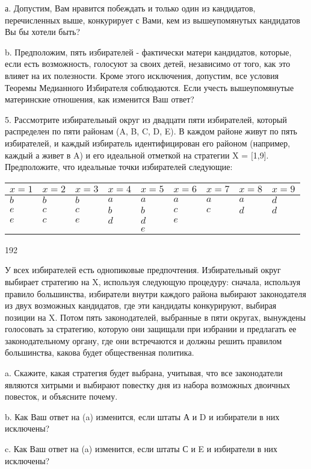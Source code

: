 \documentclass[a4paper,12pt]{article}
\begin{document}
а. Допустим, Вам нравится побеждать и только один
из кандидатов, перечисленных выше, конкурирует с
Вами, кем из вышеупомянутых кандидатов Вы бы хотели
быть?

b. Предположим, пять избирателей - фактически
матери кандидатов, которые, если есть возможность,
голосуют за своих детей, независимо от того, как
это влияет на их полезности. Кроме этого
исключения, допустим, все условия Теоремы
Медианного Избирателя соблюдаются. Если учесть
вышеупомянутые материнские отношения, как изменится
Ваш ответ?

5. Рассмотрите избирательный округ из двадцати пяти
избирателей, который распределен по пяти районам
(A, B, C, D, E). В каждом районе живут по пять
избирателей, и каждый избиратель идентифицирован
его районом (например, каждый а живет в A) и его
идеальной отметкой на стратегии X = [1,9].
Предположите, что идеальные точки избирателей
следующие:

\begin{tabular}{lllllllll}
$x=1$ & $x=2$ & $x=3$ & $x=4$ & $x=5$ & $x=6$ & $x=7$ & $x=8$ & $x=9$ \\
\hline
$b$ & $b$ & $b$ & $a$ & $a$ & $a$ & $a$ & $a$ & $d$ \\
$e$ & $c$ & $c$ & $b$ & $b$ & $c$ & $c$ & $d$ & $d$ \\
$e$ & $c$ & $e$ & $d$ & $d$ & $e$ &  &  &  \\ &  &
&  & $e$ &  &  &  &
\end{tabular}

192

У всех избирателей есть однопиковые предпочтения.
Избирательный округ выбирает стратегию на X,
используя следующую процедуру: сначала, используя
правило большинства, избиратели внутри каждого
района выбирают законодателя из двух возможных
кандидатов, где эти кандидаты конкурируют, выбирая
позиции на X. Потом пять законодателей, выбранные в
пяти округах, вынуждены голосовать за стратегию,
которую они защищали при избрании и предлагать ее
законодательному органу, где они встречаются и
должны решить правилом большинства, какова будет
общественная политика.

a. Скажите, какая стратегия будет выбрана,
учитывая, что все законодатели являются хитрыми и
выбирают повестку дня из набора возможных двоичных
повесток, и объясните почему.

b. Как Ваш ответ на (a) изменится, если штаты А и D
и избиратели в них исключены?

c. Как Ваш ответ на (a) изменится, если штаты С и E
и избиратели в них исключены?
\end{document}
